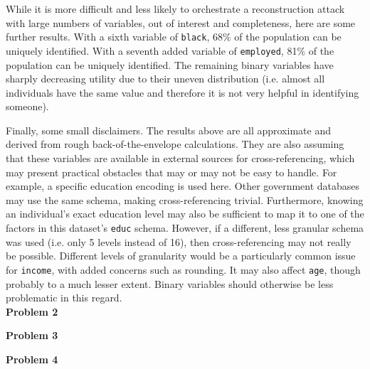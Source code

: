 \documentclass[12pt]{article}
\begin{document}
While it is more difficult and less likely to orchestrate a reconstruction attack with large numbers of variables, out of interest and completeness, here are some further results. With a sixth variable of \texttt{black}, 68\% of the population can be uniquely identified. With a seventh added variable of \texttt{employed}, 81\% of the population can be uniquely identified. The remaining binary variables have sharply decreasing utility due to their uneven distribution (i.e. almost all individuals have the same value and therefore it is not very helpful in identifying someone).

Finally, some small disclaimers. The results above are all approximate and derived from rough back-of-the-envelope calculations. They are also assuming that these variables are available in external sources for cross-referencing, which may present practical obstacles that may or may not be easy to handle. For example, a specific education encoding is used here. Other government databases may use the same schema, making cross-referencing trivial. Furthermore, knowing an individual's exact education level may also be sufficient to map it to one of the factors in this dataset's \texttt{educ} schema. However, if a different, less granular schema was used (i.e. only 5 levels instead of 16), then cross-referencing may not really be possible. Different levels of granularity would be a particularly common issue for \texttt{income}, with added concerns such as rounding. It may also affect \texttt{age}, though probably to a much lesser extent. Binary variables should otherwise be less problematic in this regard.\\

{\large\textbf{Problem 2}}


{\large\textbf{Problem 3}}


{\large\textbf{Problem 4}}



\begin{lstlisting}

\end{lstlisting}
\end{document}
